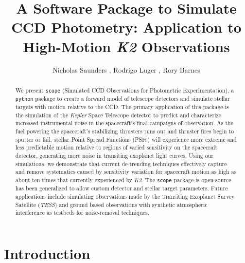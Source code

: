 \documentclass[12pt,preprint]{aastex}
\begin{document}
\title{A Software Package to Simulate CCD Photometry: Application to High-Motion \textit{K2} Observations}

\author{Nicholas Saunders , Rodrigo Luger , Rory Barnes }


\begin{abstract}

	We present \texttt{scope} (Simulated CCD Observations for Photometric Experimentation), a \texttt{python} package to create a forward model of telescope detectors and simulate stellar targets with motion relative to the CCD. The primary application of this package is the simulation of the \textit{Kepler} Space Telescope detector to predict and characterize increased instrumental noise in the spacecraft's final campaigns of observation. As the fuel powering the spacecraft's stabilizing thrusters runs out and thruster fires begin to sputter or fail, stellar Point Spread Functions (PSFs) will experience more extreme and less predictable motion relative to regions of varied sensitivity on the spacecraft detector, generating more noise in transiting exoplanet light curves. Using our simulations, we demonstrate that current de-trending techniques  effectively capture and remove systematics caused by sensitivity variation for spacecraft motion as high as about ten times that currently experienced by \textit{K2}. The \texttt{scope} package is open-source has been generalized to allow custom detector and stellar target parameters. Future applications include simulating observations made by the Transiting Exoplanet Survey Satellite (\textit{TESS}) and ground based observations with synthetic atmospheric interference as testbeds for noise-removal techniques.

\end{abstract}

\section{Introduction}
\label{sec:intro}
\end{document}
